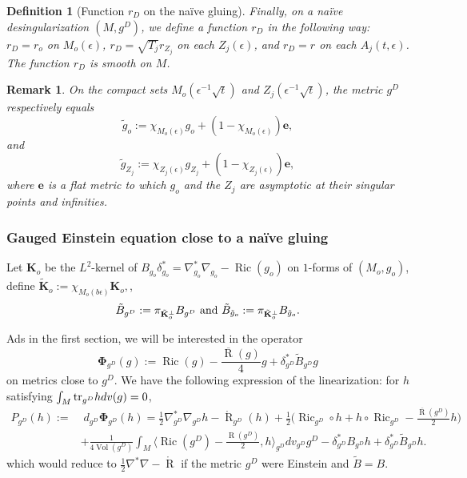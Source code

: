 \documentclass[12pt]{article}
\newtheorem{defn}[thm]{Definition}
\newtheorem{rem}[thm]{Remark}
\DeclareMathOperator{\R}{\operatorname{R}}
\DeclareMathOperator{\vol}{\operatorname{Vol}}
\DeclareMathOperator{\Ric}{\operatorname{Ric}}
\begin{document}
\begin{defn}[Function $r_D$ on the naïve gluing]
    Finally, on a naïve desingularization $(M,g^D)$, we define a function $r_D$ in the following way: $r_D = r_o$ on $M_o(\epsilon)$, $r_D = \sqrt{T_j}r_{Z_j}$ on each $Z_j(\epsilon)$, and $r_D = r$ on each $A_j(t,\epsilon)$. The function $r_D$ is smooth on $M$. 
\end{defn}
    

\begin{rem}\label{rem def tilde go tilde gbj}
    On the compact sets $M_o(\epsilon^{-1}\sqrt{t})$ and $Z_j(\epsilon^{-1}\sqrt{t})$, the metric $g^D$ respectively equals
    \begin{equation}
        \tilde{g}_o:= \chi_{M_o(\epsilon)}g_o + (1-\chi_{M_o(\epsilon)})\mathbf{e},\label{eq def tilde g_o}
    \end{equation}
    and
    \begin{equation}
        \tilde{g}_{Z_j}:= \chi_{Z_j(\epsilon)}g_{Z_j} + (1-\chi_{Z_j(\epsilon)})\mathbf{e},\label{eq def tilde gb}
    \end{equation}
    where $\mathbf{e}$ is a flat metric to which $g_o$ and the $Z_j$ are asymptotic at their singular points and infinities.
\end{rem}

\subsubsection{Gauged Einstein equation close to a naïve gluing}

    
    
    Let $\mathbf{K}_o$ be the $L^2$-kernel of $B_{g_o}\delta_{g_o}^* = \nabla_{g_o}^*\nabla_{g_o}-\Ric(g_o)$ on $1$-forms of $(M_o,g_o)$, define
    $\tilde{\mathbf{K}}_o:= \chi_{M_o(b\epsilon)}\mathbf{K}_o,$, 
    $$\tilde{B}_{g^D}:= \pi_{\tilde{\mathbf{K}}_o^\perp}B_{g^D}\textup{ and }\tilde{B}_{\tilde{g}_o}:= \pi_{\tilde{\mathbf{K}}_o^\perp}B_{\tilde{g}_o}.$$ 

 Ads in the first section, we will be interested in the operator
    $$\mathbf{\Phi}_{g^D}(g):= \Ric(g)-\frac{\overline{\R}(g)}{4}g + \delta_{g^D}^*\tilde{B}_{g^D}g$$
    on metrics close to $g^D$. We have the following expression of the linearization: for $h$ satisfying $\int_M\textup{tr}_{g^D}h dv(g)=0$,
    \begin{align}
    P_{{g^D}}(h):=& \;d_{g^D}\mathbf{\Phi}_{g^D}(h) = \frac{1}{2}\nabla^*_{g^D}\nabla_{g^D} h  -\mathring{\R}_{g^D}(h)+\frac{1}{2}\Big(\Ric_{g^D}\circ h+h\circ \Ric_{g^D} - \frac{\overline{\R}({g^D})}{2}h\Big)\nonumber\\
    &+ \frac{1}{4\vol({g^D})}\int_M\Big\langle\Ric({g^D})-\frac{\R({g^D})}{2}, h\Big\rangle_{g^D} dv_{g^D}{g^D} - \delta_{{g^D}}^*B_{g^D}h+\delta^*_{g^D}\tilde{B}_{g^D} h.\label{bar P g}
    \end{align}
    which would reduce to $ \frac{1}{2}\nabla^*\nabla  -\mathring{\R} $ if the metric $g^D$ were Einstein and $\tilde{B} = B$.
\end{document}
